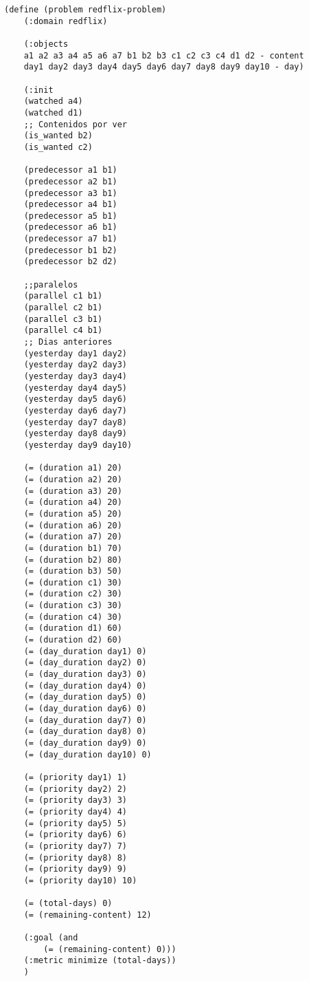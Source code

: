 \documentclass[a4paper]{article}
\begin{document}
	\begin{lstlisting}[language=PDDL, caption={Joc de Prova 2 - Extensió 4}, label={lst:JP24}]                    
	(define (problem redflix-problem)
	(:domain redflix)
	
	(:objects
	a1 a2 a3 a4 a5 a6 a7 b1 b2 b3 c1 c2 c3 c4 d1 d2 - content
	day1 day2 day3 day4 day5 day6 day7 day8 day9 day10 - day)

	(:init
	(watched a4)
	(watched d1)
	;; Contenidos por ver
	(is_wanted b2)
	(is_wanted c2)
	
	(predecessor a1 b1)
	(predecessor a2 b1)
	(predecessor a3 b1)
	(predecessor a4 b1)
	(predecessor a5 b1)
	(predecessor a6 b1)
	(predecessor a7 b1)
	(predecessor b1 b2)
	(predecessor b2 d2)
	
	;;paralelos
	(parallel c1 b1)
	(parallel c2 b1)
	(parallel c3 b1)
	(parallel c4 b1)
	;; Dias anteriores
	(yesterday day1 day2)
	(yesterday day2 day3)
	(yesterday day3 day4)
	(yesterday day4 day5)
	(yesterday day5 day6)
	(yesterday day6 day7)
	(yesterday day7 day8)
	(yesterday day8 day9)
	(yesterday day9 day10)
	
	(= (duration a1) 20)
	(= (duration a2) 20)
	(= (duration a3) 20)
	(= (duration a4) 20)
	(= (duration a5) 20)
	(= (duration a6) 20)
	(= (duration a7) 20)
	(= (duration b1) 70)
	(= (duration b2) 80)
	(= (duration b3) 50)
	(= (duration c1) 30)
	(= (duration c2) 30)
	(= (duration c3) 30)
	(= (duration c4) 30)
	(= (duration d1) 60)
	(= (duration d2) 60)
	(= (day_duration day1) 0)
	(= (day_duration day2) 0)
	(= (day_duration day3) 0)
	(= (day_duration day4) 0)
	(= (day_duration day5) 0)
	(= (day_duration day6) 0)
	(= (day_duration day7) 0)
	(= (day_duration day8) 0)
	(= (day_duration day9) 0)
	(= (day_duration day10) 0)
	
	(= (priority day1) 1)
	(= (priority day2) 2)
	(= (priority day3) 3)
	(= (priority day4) 4)
	(= (priority day5) 5)
	(= (priority day6) 6)
	(= (priority day7) 7)
	(= (priority day8) 8)
	(= (priority day9) 9)
	(= (priority day10) 10)
	
	(= (total-days) 0)
	(= (remaining-content) 12) 

	(:goal (and
		(= (remaining-content) 0)))
	(:metric minimize (total-days))
	)
		
	\end{lstlisting}

	
\end{document}
